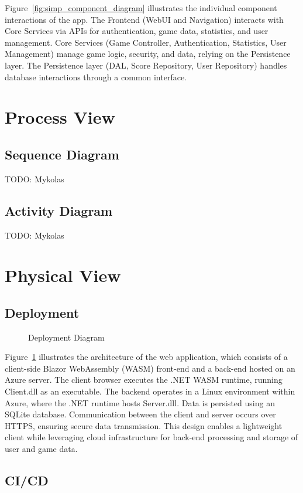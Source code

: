 \documentclass[11pt,a4paper]{article}
\newcommand{\inputdiagram}[1]{}
\newcommand{\textwidthdiagram}[2][1]{%
  \resizebox{#1\textwidth}{!}{\inputdiagram{#2}}%
}
\begin{document}
Figure~\ref{fig:simp_component_diagram} illustrates the individual component interactions of the app. The Frontend (WebUI and Navigation) interacts with Core Services via APIs for authentication, game data, statistics, and user management. Core Services (Game Controller, Authentication, Statistics, User Management) manage game logic, security, and data, relying on the Persistence layer. The Persistence layer (DAL, Score Repository, User Repository) handles database interactions through a common interface.

\section{Process View}

\subsection{Sequence Diagram}
TODO: Mykolas
\subsection{Activity Diagram}
TODO: Mykolas

\section{Physical View}
\subsection{Deployment}
\begin{figure}[H]
    \centering
    \textwidthdiagram[0.8]{deployment_diagram.tex}
    \caption{Deployment Diagram}
    \label{fig:deployment_diagram}
\end{figure}

Figure~\ref{fig:deployment_diagram} illustrates the architecture of the web application,
which consists of a client-side Blazor WebAssembly (WASM) front-end and a back-end hosted on an Azure server. The client browser executes the .NET WASM
runtime, running Client.dll as an executable. The backend operates in a Linux
environment within Azure, where the .NET runtime hosts Server.dll. Data is
persisted using an SQLite database. Communication between the client and
server occurs over HTTPS, ensuring secure data transmission. This design
enables a lightweight client while leveraging cloud infrastructure for
back-end processing and storage of user and game data.

\subsection{CI/CD}
\end{document}
